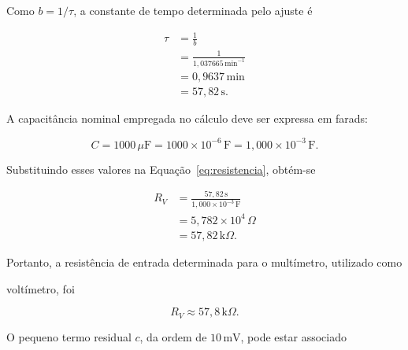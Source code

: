 \documentclass[a4paper,12pt]{article}
\begin{document}
Como $b=1/\tau$, a constante de tempo determinada pelo ajuste é

\begin{align*}

  \tau

    &=\frac{1}{b}\\

    &=\frac{1}{1{,}037665\,\mathrm{min}^{-1}}\\

    &=0{,}9637\,\mathrm{min}\\

    &=57{,}82\,\mathrm{s}.

\end{align*}

A capacitância nominal empregada no cálculo deve ser expressa em farads:

\begin{equation}

  C=1000\,\mu\mathrm{F}

   =1000\times10^{-6}\,\mathrm{F}

   =1{,}000\times10^{-3}\,\mathrm{F}.

\end{equation}

Substituindo esses valores na Equação~\eqref{eq:resistencia}, obtém-se

\begin{align*}

  R_V

    &=\frac{57{,}82\,\mathrm{s}}

            {1{,}000\times10^{-3}\,\mathrm{F}}\\

    &=5{,}782\times10^4\,\Omega\\

    &=57{,}82\,\mathrm{k}\Omega.

\end{align*}

Portanto, a resistência de entrada determinada para o multímetro, utilizado como

voltímetro, foi

\begin{equation}

  \boxed{R_V\approx57{,}8\,\mathrm{k}\Omega}.

\end{equation}

O pequeno termo residual $c$, da ordem de $10\,\mathrm{mV}$, pode estar associado
\end{document}

